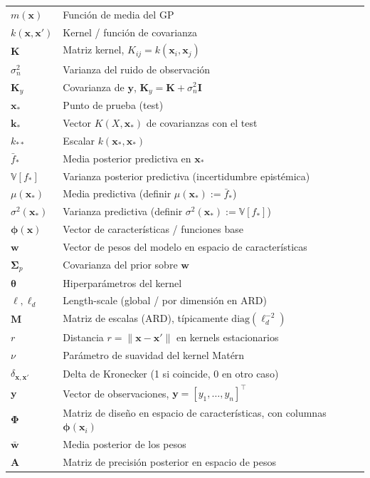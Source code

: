 \begin{tabular}{ll}
$m(\bm{x})$ & Función de media del GP \\
$k(\bm{x},\bm{x}')$ & Kernel / función de covarianza \\
$\bm{K}$ & Matriz kernel, $K_{ij}=k(\bm{x}_i,\bm{x}_j)$ \\
$\sigma_n^2$ & Varianza del ruido de observación \\
$\bm{K}_y$ & Covarianza de $\bm{y}$, $\bm{K}_y=\bm{K}+\sigma_n^2\bm{I}$ \\
$\bm{x}_*$ & Punto de prueba (test) \\
$\bm{k}_*$ & Vector $K(X,\bm{x}_*)$ de covarianzas con el test \\
$k_{**}$ & Escalar $k(\bm{x}_*,\bm{x}_*)$ \\
$\bar{f}_*$ & Media posterior predictiva en $\bm{x}_*$ \\
$\mathbb{V}[f_*]$ & Varianza posterior predictiva (incertidumbre epistémica) \\
$\mu(\bm{x}_*)$ & Media predictiva (definir $\mu(\bm{x}_*) := \bar{f}_*$) \\
$\sigma^2(\bm{x}_*)$ & Varianza predictiva (definir $\sigma^2(\bm{x}_*) := \mathbb{V}[f_*]$) \\
$\bm{\phi}(\bm{x})$ & Vector de características / funciones base \\
$\bm{w}$ & Vector de pesos del modelo en espacio de características \\
$\bm{\Sigma}_p$ & Covarianza del prior sobre $\bm{w}$ \\
$\bm{\theta}$ & Hiperparámetros del kernel \\
$\ell,\ell_d$ & Length-scale (global / por dimensión en ARD) \\
$\bm{M}$ & Matriz de escalas (ARD), típicamente $\mathrm{diag}(\ell_d^{-2})$ \\
$r$ & Distancia $r=\|\bm{x}-\bm{x}'\|$ en kernels estacionarios \\
$\nu$ & Parámetro de suavidad del kernel Mat\'ern \\
$\delta_{\bm{x},\bm{x}'}$ & Delta de Kronecker (1 si coincide, 0 en otro caso) \\
$\bm{y}$ & Vector de observaciones, $\bm{y}=[y_1,\dots,y_n]^\top$ \\
$\bm{\Phi}$ & Matriz de diseño en espacio de características, con columnas $\bm{\phi}(\bm{x}_i)$ \\
$\bar{\bm{w}}$ & Media posterior de los pesos \\
$\bm{A}$ & Matriz de precisión posterior en espacio de pesos \\

\end{tabular}
